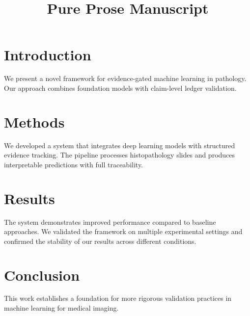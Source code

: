 \documentclass{article}
\title{Pure Prose Manuscript}
\begin{document}
\section{Introduction}

We present a novel framework for evidence-gated machine learning in pathology.
Our approach combines foundation models with claim-level ledger validation.

\section{Methods}

We developed a system that integrates deep learning models with
structured evidence tracking. The pipeline processes histopathology
slides and produces interpretable predictions with full traceability.

\section{Results}

The system demonstrates improved performance compared to baseline
approaches. We validated the framework on multiple experimental settings
and confirmed the stability of our results across different conditions.

\section{Conclusion}

This work establishes a foundation for more rigorous validation
practices in machine learning for medical imaging.
\end{document}
